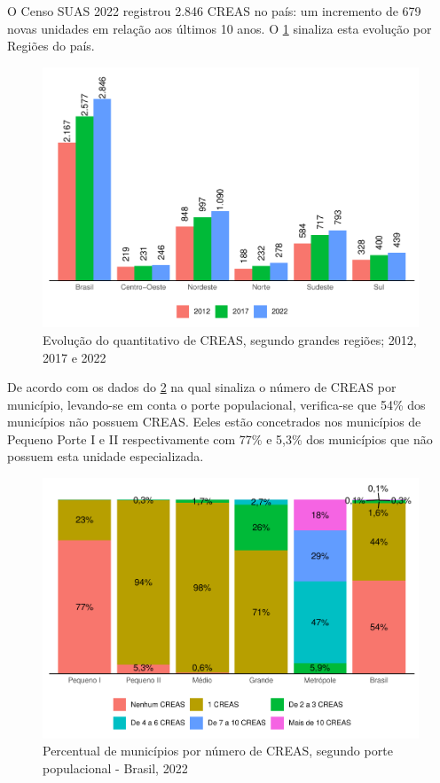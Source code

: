 \documentclass[
  brazilian]{report}
\begin{document}
O Censo SUAS 2022 registrou 2.846 CREAS no país: um incremento de 679
novas unidades em relação aos últimos 10 anos. O
\cref{fig:creas-quantitativo} sinaliza esta evolução por Regiões do
país.

\begin{figure}
\includegraphics{Censo-SUAS-2022_files/figure-latex/creas-quantitativo-1} \caption[Evolução do quantitativo de CREAS, segundo grandes regiões]{Evolução do quantitativo de CREAS, segundo grandes regiões; 2012, 2017 e 2022}\label{fig:creas-quantitativo}
\end{figure}

De acordo com os dados do \cref{fig:CREAS-porte} na qual sinaliza o
número de CREAS por município, levando-se em conta o porte populacional,
verifica-se que 54\% dos municípios não possuem CREAS. Eeles estão
concetrados nos municípios de Pequeno Porte I e II respectivamente com
77\% e 5,3\% dos municípios que não possuem esta unidade especializada.

\begin{figure}
\includegraphics{Censo-SUAS-2022_files/figure-latex/CREAS-porte-1} \caption[Percentual de municípios por número de CREAS, segundo porte populacional - Brasil, 2022]{Percentual de municípios por número de CREAS, segundo porte populacional - Brasil, 2022}\label{fig:CREAS-porte}
\end{figure}
\end{document}
